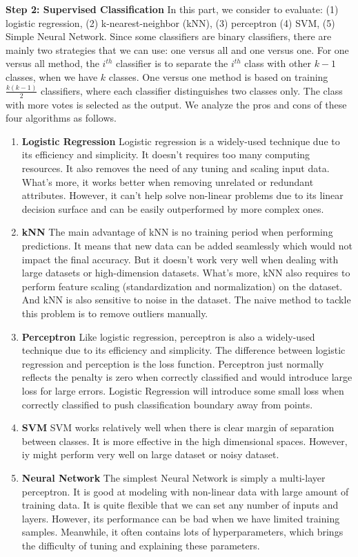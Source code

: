 \documentclass[12pt]{article}
\begin{document}
\textbf{Step 2: Supervised Classification} 
In this part, we consider to evaluate: (1) logistic regression, (2) k-nearest-neighbor (kNN), (3) perceptron (4) SVM, (5) Simple Neural Network. Since some classifiers are binary classifiers, there are mainly two strategies that we can use: one versus all and one versus one. For one versus all method, the $i^{th}$ classifier is to separate the $i^{th}$ class with other $k-1$ classes, when we have $k$ classes. One versus one method is based on training $\frac{k(k-1)}{2}$ classifiers, where each classifier distinguishes two classes only. The class with more votes is selected as the output. We analyze the pros and cons of these four algorithms as follows.

\begin{enumerate}[label=(\roman*)]
	\item \textbf{Logistic Regression} 
	Logistic regression is a widely-used technique due to its efficiency and simplicity. It doesn't requires too many computing resources. It also removes the need of any tuning and scaling input data. What's more, it works better when removing unrelated or redundant attributes. However, it can't help solve non-linear problems due to its linear decision surface and can be easily outperformed by more complex ones.
	\item \textbf{kNN} 
	The main advantage of kNN is no training period when performing predictions. It means that new data can be added seamlessly which would not impact the final accuracy. But it doesn't work very well when dealing with large datasets or high-dimension datasets. What's more, kNN also requires to perform feature scaling (standardization and normalization) on the dataset. And kNN is also sensitive to noise in the dataset. The naive method to tackle this problem is to remove outliers manually.
    \item \textbf{Perceptron} 
	Like logistic regression, perceptron is also a widely-used technique due to its efficiency and simplicity. The difference between logistic regression and perception is the loss function. Perceptron just normally reflects the penalty is zero when correctly classified and would introduce large loss for large errors. Logistic Regression will introduce some small loss when correctly classified to push classification boundary away from points.
	\item \textbf{SVM} 
	SVM works relatively well when there is clear margin of separation between classes. It is more effective in the high dimensional spaces. However, iy might perform very well on large dataset or noisy dataset.
	\item \textbf{Neural Network} The simplest Neural Network is simply a multi-layer perceptron. It is good at modeling with non-linear data with large amount of training data. It is quite flexible that we can set any number of inputs and layers. However, its performance can be bad when we have limited training samples. Meanwhile, it often contains lots of hyperparameters, which brings the difficulty of tuning and explaining these parameters. 
\end{enumerate}
\end{document}
